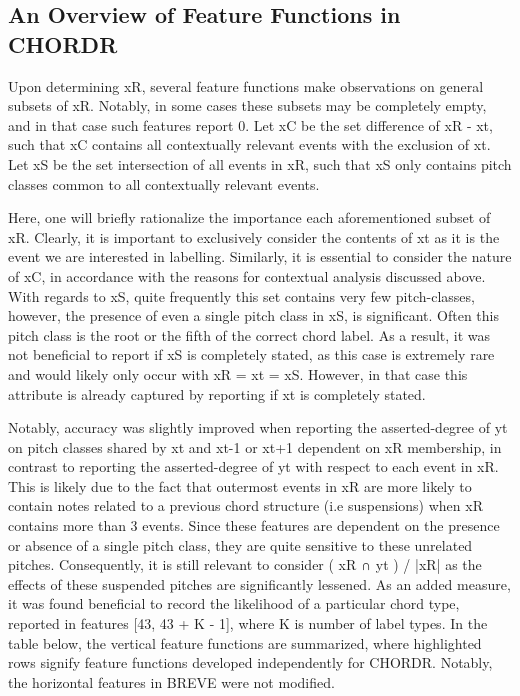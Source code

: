 \documentclass{article} %
\begin{document}
\subsection{An Overview of Feature Functions in CHORDR}

Upon determining xR, several feature functions make observations on general subsets of xR. Notably, in some cases these subsets may be completely empty, and in that case such features report 0. Let xC be the set difference of xR - xt, such that xC contains all contextually relevant events with the exclusion of xt. Let xS be the set intersection of all events in xR, such that xS only contains pitch classes common to all contextually relevant events.

Here, one will briefly rationalize the importance each aforementioned subset of xR. Clearly, it is important to exclusively consider the contents of xt as it is the event we are interested in labelling. Similarly, it is essential to consider the nature of xC, in accordance with the reasons for contextual analysis discussed above. With regards to xS, quite frequently this set contains very few pitch-classes, however, the presence of even a single pitch class in xS, is significant. Often this pitch class is the root or the fifth of the correct chord label. As a result, it was not beneficial to report if xS is completely stated, as this case is extremely rare and would likely only occur with xR = xt = xS. However, in that case this attribute is already captured by reporting if xt is completely stated.

Notably, accuracy was slightly improved when reporting the asserted-degree of yt on pitch classes shared by xt and xt-1 or xt+1 dependent on xR membership, in contrast to reporting the asserted-degree of yt with respect to each event in xR. This is likely due to the fact that outermost events in xR are more likely to contain notes related to a previous chord structure (i.e suspensions) when xR contains more than 3 events. Since these features are dependent on the presence or absence of a single pitch class, they are quite sensitive to these unrelated pitches. Consequently, it is still relevant to consider ( xR ∩ yt ) / |xR| as the effects of these suspended pitches are significantly lessened. As an added measure, it was found beneficial to record the likelihood of a particular chord type, reported in features [43, 43 + K - 1], where K is number of label types. In the table below, the vertical feature functions are summarized, where highlighted rows signify feature functions developed independently for CHORDR. Notably, the horizontal features in BREVE were not modified.
\end{document}
